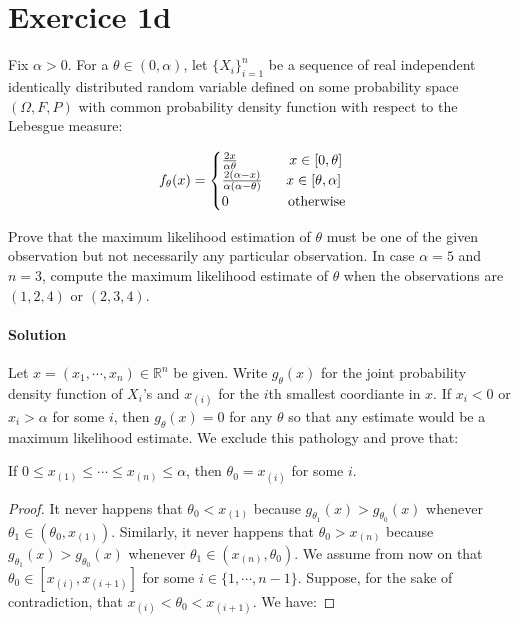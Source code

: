 \documentclass[../main.tex]{subfiles}
\begin{document}
\section{Exercice 1d}
\begin{CJK*}{UTF8}{gbsn}
Fix $\alpha > 0$. For a $\theta \in (0, \alpha)$,
let $\{X_i\}_{i=1}^n$ be a sequence of real independent identically distributed random variable 
defined on some probability space $(\Omega, F, P)$
with common probability density function with respect to the Lebesgue measure:

\begin{equation*}
    f_{\theta}(x) = 
    \begin{cases}
        \frac{2x}{\alpha \theta} \tab[1.3cm] x \in [0, \theta] \\
        \frac{2(\alpha-x)}{\alpha(\alpha - \theta)} \tab[0.6cm] x \in [\theta, \alpha] \\
        0 \tab[1.5cm] \text{otherwise}
    \end{cases}
\end{equation*}

Prove that the maximum likelihood estimation of $\theta$ must be one of the given observation
but not necessarily any particular observation. 
In case $\alpha = 5$ and $n=3$, compute the maximum likelihood estimate of $\theta$ when the 
observations are $(1,2,4)$ or $(2,3,4)$.  

\smallskip
\paragraph{Solution}
Let $x = (x_1, \cdots, x_n) \in \mathbb{R}^n$ be given. 
Write $g_{\theta}(x)$ for the joint probability density function of $X_i$'s 
and $x_{(i)}$ for the $i$th smallest coordiante in $x$.
If $x_i < 0$ or $x_i > \alpha$ for some $i$, then $g_{\theta}(x)=0$ for any $\theta$ so that 
any estimate would be a maximum likelihood estimate.
We exclude this pathology and prove that:

\begin{theorem}
If $0 \leqslant x_{(1)} \leqslant \cdots \leqslant x_{(n)} \leqslant \alpha$, then $\theta_0 = x_{(i)}$ for some $i$.
\end{theorem}

\begin{proof}
It never happens that $\theta_0 < x_{(1)}$
because $g_{\theta_1}(x) > g_{\theta_0}(x)$ whenever $\theta_1 \in (\theta_0,x_{(1)})$.
Similarly, it never happens that $\theta_0 > x_{(n)}$ because
$g_{\theta_1}(x) > g_{\theta_0}(x)$ whenever $\theta_1 \in (x_{(n)}, \theta_0)$.
We assume from now on that $\theta_0 \in [x_{(i)}, x_{(i+1)}]$ for some $i \in \{1,\cdots, n-1\}$.
Suppose, for the sake of contradiction, that $x_{(i)} < \theta_0 < x_{(i+1)}$. We have:


\end{proof}
\end{CJK*}
\end{document}
